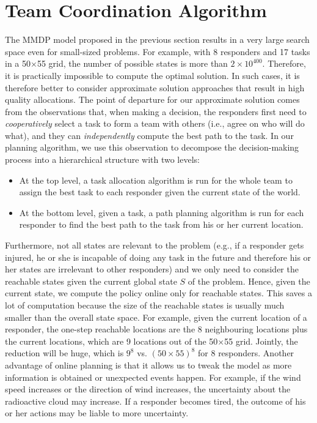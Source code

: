 \section{Team Coordination Algorithm}
\label{sec:algo} \noindent The  MMDP model proposed in the previous
section results in a very large search space even for small-sized
problems. For example, with 8 responders and 17 tasks in a
50$\times$55 grid, the number of possible states is more than
$2\times 10^{400}$. Therefore, it is practically impossible to
compute the optimal solution. In such cases, it is therefore better
to consider approximate solution approaches that result in high
quality allocations.  The point of departure for our approximate
solution comes from the observations that, when making a decision,
the responders first need to {\em cooperatively} select a task to
form a team with others (i.e., agree on who will do what), and they
can {\em independently} compute the best path to the task. In our
planning algorithm, we use this observation to decompose the
decision-making process into a hierarchical structure with two
levels:
\begin{itemize}
  \itemsep=-2pt
  \item At the top level, a task allocation algorithm is run for
      the whole team to assign the best task to each responder
      given the current state of the world.
  \item At the bottom level, given a task, a path planning
      algorithm is run for each responder to find the best path
      to the task from his or her current location.
\end{itemize}

Furthermore, not all states are relevant to the problem (e.g., if a
responder gets injured, he or she is incapable of doing any task in
the future and therefore his or her states are irrelevant to other
responders) and we only need to consider the reachable states given
the current global state $S$ of the problem. Hence, given the
current state, we compute the policy online only for reachable
states. This saves a lot of computation because the size of the
reachable states is usually much smaller than the overall state
space. For example, given the current location of a responder, the
one-step reachable locations are the 8 neighbouring locations plus
the current locations, which are 9 locations out of the
50$\times$55 grid. Jointly, the reduction will be huge, which is
$9^8$ vs. $(50\times 55)^8$ for 8 responders. Another advantage of
online planning is that it allows us to tweak the model as more
information is obtained or unexpected events happen. For example,
if the wind speed increases or the direction of wind increases, the
uncertainty about the radioactive cloud may increase. If a
responder becomes tired, the outcome of his or her actions may be
liable to more uncertainty.

